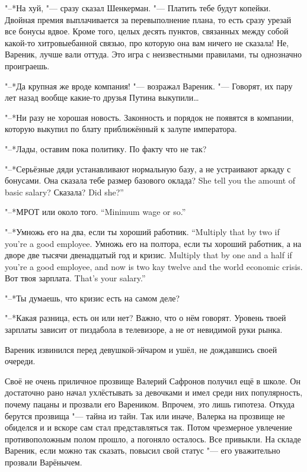 "--*На хуй, "--- сразу сказал Шенкерман.
"--- Платить тебе будут копейки.
Двойная премия выплачивается за перевыполнение плана, то есть сразу урезай все бонусы вдвое.
Кроме того, целых десять пунктов, связанных между собой какой-то хитровыебанной связью, про которую она вам ничего не сказала!
Не, Вареник, лучше вали оттуда.
Это игра с неизвестными правилами, ты однозначно проиграешь.

"--*Да крупная же вроде компания! "--- возражал Вареник.
"--- Говорят, их пару лет назад вообще какие-то друзья Путина выкупили\ldots{}

"--*Ни разу не хорошая новость.
Законность и порядок не появятся в компании, которую выкупил по блату приближённый к залупе императора.

"--*Лады, оставим пока политику.
По факту что не так?

"--*Серьёзные дяди устанавливают нормальную базу, а не устраивают аркаду с бонусами.
{Она сказала тебе размер базового оклада?}
{She tell you the amount of basic salary?}
{Сказала?}
{Did she?''}

{"--*МРОТ или около того.}
{``Minimum wage or so.''}

{"--*Умножь его на два, если ты хороший работник.}
{``Multiply that by two if you're a good employee.}
{Умножь его на полтора, если ты хороший работник, а на дворе две тысячи двенадцатый год и кризис.}
{Multiply that by one and a half if you're a good employee, and now is two kay twelve and the world economic crisis.}
{Вот твоя зарплата.}
{That's your salary.''}

"--*Ты думаешь, что кризис есть на самом деле?

"--*Какая разница, есть он или нет?
Важно, что о нём говорят.
Уровень твоей зарплаты зависит от пиздабола в телевизоре, а не от невидимой руки рынка.

Вареник извинился перед девушкой-эйчаром и ушёл, не дождавшись своей очереди.

\asterism

Своё не очень приличное прозвище Валерий Сафронов получил ещё в школе.
Он достаточно рано начал ухлёстывать за девочками и имел среди них популярность, почему пацаны и прозвали его Вареником.
Впрочем, это лишь гипотеза.
Откуда берутся прозвища "--- тайна из тайн.
Так или иначе, Валерка на прозвище не обиделся и и вскоре сам стал представляться так.
Потом чрезмерное увлечение противоположным полом прошло, а погоняло осталось.
Все привыкли.
На складе Вареник, если можно так сказать, повысил свой статус "--- его уважительно прозвали Варёнычем.

